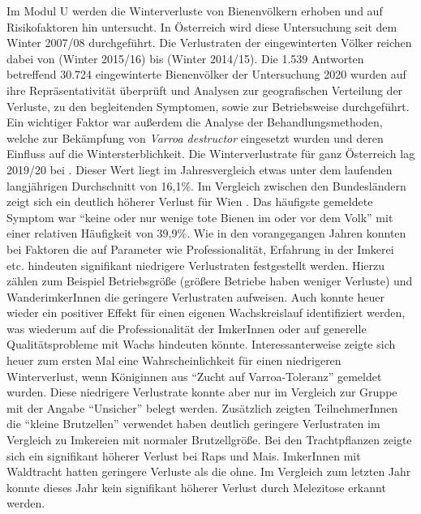 Im Modul U werden die Winterverluste von Bienenvölkern erhoben und auf Risikofaktoren hin untersucht. In Österreich wird diese Untersuchung seit dem Winter 2007/08 durchgeführt. Die Verlustraten der eingewinterten Völker reichen dabei von  (Winter 2015/16) bis  (Winter 2014/15). 
\newline
Die 1.539 Antworten betreffend 30.724 eingewinterte Bienenvölker der Untersuchung 2020 wurden auf ihre Repräsentativität überprüft und Analysen zur geografischen Verteilung der Verluste, zu den begleitenden Symptomen, sowie zur Betriebsweise durchgeführt. Ein wichtiger Faktor war außerdem die Analyse der Behandlungsmethoden, welche zur Bekämpfung von \textit{Varroa destructor} eingesetzt wurden und deren Einfluss auf die Wintersterblichkeit.
\newline
Die Winterverlustrate für ganz Österreich lag 2019/20 bei . Dieser Wert liegt im Jahresvergleich etwas unter dem laufenden langjährigen Durchschnitt von 16,1\%. Im Vergleich zwischen den Bundesländern zeigt sich ein deutlich höherer Verlust für Wien . Das häufigste gemeldete Symptom war \enquote{keine oder nur wenige tote Bienen im oder vor dem Volk} mit einer relativen Häufigkeit von 39,9\%.
\newline
Wie in den vorangegangen Jahren konnten bei Faktoren die auf Parameter wie Professionalität, Erfahrung in der Imkerei etc. hindeuten signifikant niedrigere Verlustraten festgestellt werden. Hierzu zählen zum Beispiel Betriebsgröße (größere Betriebe haben weniger Verluste) und WanderimkerInnen die geringere Verlustraten aufweisen. Auch konnte heuer wieder ein positiver Effekt für einen eigenen Wachskreislauf identifiziert werden, was wiederum auf die Professionalität der ImkerInnen oder auf generelle Qualitätsprobleme mit Wachs hindeuten könnte. 
\newline
Interessanterweise zeigte sich heuer zum ersten Mal eine Wahrscheinlichkeit für einen niedrigeren Winterverlust, wenn Königinnen aus \enquote{Zucht auf Varroa-Toleranz} gemeldet wurden. Diese niedrigere Verlustrate konnte aber nur im Vergleich zur Gruppe mit der Angabe \enquote{Unsicher} belegt werden. Zusätzlich zeigten TeilnehmerInnen die \enquote{kleine Brutzellen} verwendet haben deutlich geringere Verlustraten im Vergleich zu Imkereien mit normaler Brutzellgröße.
\newline
Bei den Trachtpflanzen zeigte sich ein signifikant höherer Verlust bei Raps und Mais. ImkerInnen mit Waldtracht hatten geringere Verluste als die ohne. Im Vergleich zum letzten Jahr konnte dieses Jahr kein signifikant höherer Verlust durch Melezitose erkannt werden. 
